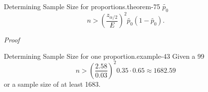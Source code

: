 \documentclass[10pt,]{book}
\makeatletter
\renewcommand*{\proofname}{Proof}
\renewenvironment{proof}[1][\proofname]{\par
  \pushQED{\qed}%
  \normalfont \topsep6\p@\@plus6\p@\relax
  \trivlist
  \item\relax
    {\itshape
    #1\@addpunct{.}}\hspace\labelsep\ignorespaces
}{%
  \popQED\endtrivlist\@endpefalse
}
\numberwithin{equation}{section}
\newcommand{\gt}{>}
\makeatother
\begin{document}
%
\begin{theorem}{Determining Sample Size for proportions.}{}{theorem-75}%
\(\tilde{p_0}\)%
\begin{equation*}
n \gt \left ( \frac{z_{\alpha /2}}{E} \right )^2 \tilde{p_0}(1-\tilde{p_0}).
\end{equation*}
\end{theorem}
\begin{proof}\hypertarget{proof-73}{}
\end{proof}
\begin{example}{Determining Sample Size for one proportion.}{example-43}%
\hypertarget{p-1127}{}%
Given a 99%
\begin{equation*}
n \gt \left ( \frac{2.58}{0.03} \right )^2 0.35 \cdot 0.65 \approx 1682.59
\end{equation*}
or a sample size of at least 1683.%
\end{example}
%
%
\typeout{************************************************}
\typeout{************************************************}
%
\end{document}
